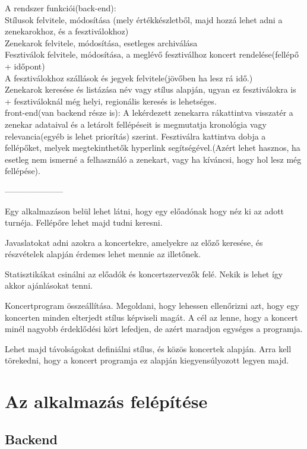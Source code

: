 \documentclass[11pt]{article}
\begin{document}
A rendszer funkciói(back-end):\\
Stílusok felvitele, módosítása (mely értékkészletből, majd hozzá lehet adni a zenekarokhoz, és a fesztiválokhoz)\\
Zenekarok felvitele, módosítása, esetleges archiválása\\
Fesztiválok felvitele, módosítása, a meglévő fesztiválhoz koncert rendelése(fellépő + időpont)\\
A fesztiválokhoz szállások és jegyek felvitele(jövőben ha lesz rá idő.)\\
Zenekarok keresése és listázása név vagy stílus alapján, ugyan ez fesztiválokra is + fesztiváloknál még helyi, regionális keresés is lehetséges.\\
front-end(van backend része is):
A lekérdezett zenekarra rákattintva visszatér a zenekar adataival és a letárolt fellépéseit is megmutatja kronológia vagy relevancia(egyéb is lehet priorítás) szerint.
Fesztiválra kattintva dobja a fellépőket, melyek megtekinthetők hyperlink segítségével.(Azért lehet hasznos, ha esetleg nem ismerné a felhasználó a zenekart, vagy ha kíváncsi, hogy hol lesz még fellépése).

---------------------

Egy alkalmazáson belül lehet látni, hogy egy előadónak hogy néz ki az adott turnéja. Fellépőre lehet majd tudni keresni.

Javaslatokat adni azokra a koncertekre, amelyekre az előző keresése, és részvételek alapján érdemes lehet mennie az illetőnek.

Statisztikákat csinálni az előadók és koncertszervezők felé. Nekik is lehet így akkor ajánlásokat tenni.

Koncertprogram összeállítása. Megoldani, hogy lehessen ellenőrizni azt, hogy egy koncerten minden elterjedt stílus képviseli magát. A cél az lenne, hogy a koncert minél nagyobb érdeklődési kört lefedjen, de azért maradjon egységes a programja.

Lehet majd távolságokat definiálni stílus, és közös koncertek alapján. Arra kell törekedni, hogy a koncert programja ez alapján kiegyensúlyozott legyen majd.

\section{Az alkalmazás felépítése}

\subsection{Backend}
\end{document}
